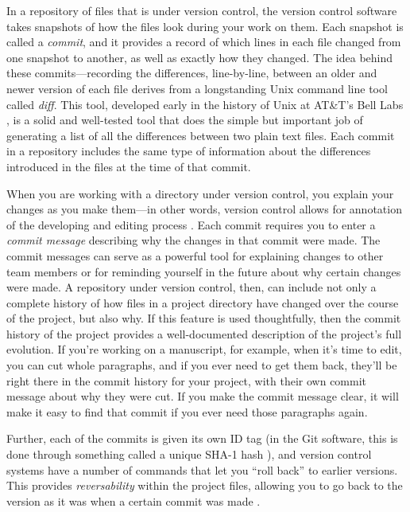 \documentclass[]{tufte-book}
\begin{document}
In a repository of files that is under version control, the version control
software takes snapshots of how the files look during your work on them. Each
snapshot is called a \emph{commit}, and it provides a record of which lines in each
file changed from one snapshot to another, as well as exactly how they changed.
The idea behind these commits---recording the differences, line-by-line, between
an older and newer version of each file derives from a longstanding Unix command
line tool called \emph{diff}. This tool, developed early in the history of Unix at
AT\&T's Bell Labs \citep{raymond2003art}, is a solid and well-tested tool that does
the simple but important job of generating a list of all the differences between
two plain text files. Each commit in a repository includes the same type of
information about the differences introduced in the files at the time of that
commit.

When you are working with a directory under version control, you explain your
changes as you make them---in other words, version control allows for annotation
of the developing and editing process \citep{raymondunderstanding}. Each commit
requires you to enter a \emph{commit message} describing why the changes in that
commit were made. The commit messages can serve as a powerful tool for
explaining changes to other team members or for reminding yourself in the future
about why certain changes were made. A repository under version control, then,
can include not only a complete history of how files in a project directory have
changed over the course of the project, but also why. If this feature is used
thoughtfully, then the commit history of the project provides a well-documented
description of the project's full evolution. If you're working on a manuscript,
for example, when it's time to edit, you can cut whole paragraphs, and if you
ever need to get them back, they'll be right there in the commit history for
your project, with their own commit message about why they were cut. If you make
the commit message clear, it will make it easy to find that commit if you ever
need those paragraphs again.

Further, each of the commits is given its own ID tag (in the Git software,
this is done through something called a unique SHA-1 hash \citep{klemens201421st}),
and version control systems have a number of commands that let you ``roll back''
to earlier versions. This provides \emph{reversability} within the project files,
allowing you to go back to the version as it was when a certain commit was made
\citep{raymondunderstanding}.
\end{document}
